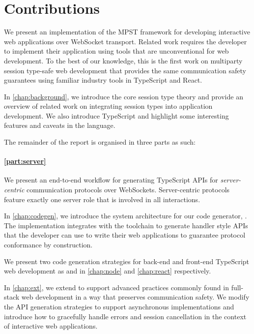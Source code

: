 \section{Contributions}

We present an implementation of the MPST framework for developing
interactive web applications over WebSocket transport. 
Related work \citep{PureScript2019, MVU2020, LINKS, Tiers} requires the 
developer to implement their application using tools that are 
unconventional for web development.
To the best of our knowledge, this is the first work on multiparty session
type-safe web development that provides the same communication safety 
guarantees using familiar industry tools in TypeScript and React.

In \cref{chap:background}, we introduce the core session type theory
and provide an overview of related work on integrating session types into
application development. We also introduce TypeScript and highlight some 
interesting features and caveats in the language.

The remainder of the report is organised in three parts as such:

\paragraph{\cref{part:server}}
We present an end-to-end workflow for generating TypeScript APIs for 
\emph{server-centric} communication protocols over WebSockets. Server-centric 
protocols feature exactly one server role that is involved in all interactions.

In \cref{chap:codegen}, we introduce the system architecture for our
code generator, . 
The implementation integrates with the 
toolchain to generate handler style APIs that the developer can use to write 
their web applications to guarantee protocol conformance by construction.

We present two code generation strategies for back-end and front-end
TypeScript web development as  and 
in \cref{chap:node} and \cref{chap:react} respectively.

In \cref{chap:ext}, we extend  to support advanced
practices commonly found in full-stack web development in a way that
preserves communication safety. We modify the API generation strategies
to support asynchronous implementations and introduce how to 
gracefully handle errors and session cancellation 
in the context of interactive web applications.

